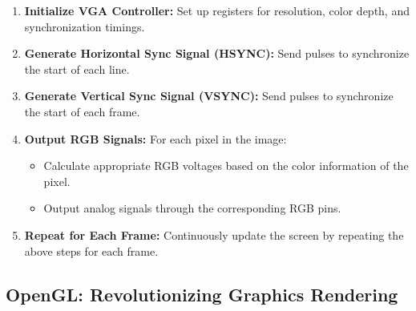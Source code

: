 \begin{enumerate}
    \item \textbf{Initialize VGA Controller:} Set up registers for resolution, color depth, and synchronization timings.
    
    \item \textbf{Generate Horizontal Sync Signal (HSYNC):} Send pulses to synchronize the start of each line.
    
    \item \textbf{Generate Vertical Sync Signal (VSYNC):} Send pulses to synchronize the start of each frame.
    
    \item \textbf{Output RGB Signals:} For each pixel in the image:
    \begin{itemize}
        \item Calculate appropriate RGB voltages based on the color information of the pixel.
        \item Output analog signals through the corresponding RGB pins.
    \end{itemize}
    
    \item \textbf{Repeat for Each Frame:} Continuously update the screen by repeating the above steps for each frame.
\end{enumerate}


\pagebreak  

\subsection*{OpenGL: Revolutionizing Graphics Rendering}







